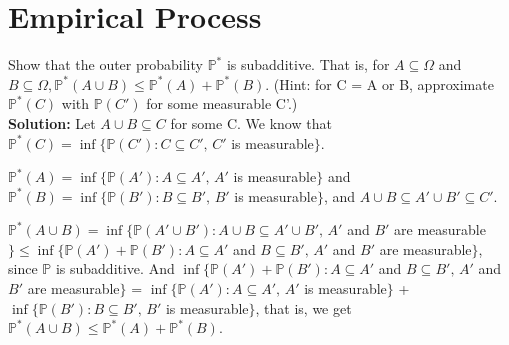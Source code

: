 \documentclass[11pt,letterpaper]{article}                  %
\begin{document}
\section{Empirical Process}

\begin{problem} Show that the outer probability $\mathbb{P}^*$ is subadditive. That is, for $A \subseteq \Omega$ and $B \subseteq \Omega, \mathbb{P}^*(A \cup B) \leq \mathbb{P}^*(A) + \mathbb{P}^*(B)$. (Hint: for C = A or B, approximate $\mathbb{P}^*(C)$ with $\mathbb{P}(C')$ for some measurable C'.) \\
	
	\textbf{Solution:}  Let $A \cup B \subseteq C$ for some C. We know that $\mathbb{P}^*(C) = \inf \{\mathbb{P}(C'): C \subseteq C', \, C'$ is measurable$\}$. 
	
	$\mathbb{P}^*(A) = \inf \{\mathbb{P}(A'): A \subseteq A', \, A'$ is measurable$\}$ and $\mathbb{P}^*(B) = \inf \{\mathbb{P}(B'): B \subseteq B', \, B'$ is measurable$\}$, and $A \cup B \subseteq A' \cup B' \subseteq C'$. 
	
	$\mathbb{P}^*(A \cup B) = \inf \{\mathbb{P}(A' \cup B'): A \cup B \subseteq A' \cup B', \, A'$ and $B'$ are measurable$\} \leq \inf \{\mathbb{P}(A') +  \mathbb{P}(B'): A \subseteq A'$ and $B \subseteq B', \, A'$ and $B'$ are measurable$\}$, since $\mathbb{P}$ is subadditive. And $\inf \{\mathbb{P}(A') +  \mathbb{P}(B'): A \subseteq A'$ and $B \subseteq B', \, A'$ and $B'$ are measurable$\}$ = $\inf \{\mathbb{P}(A'): A \subseteq A', \, A'$ is measurable$\}$ + $\inf \{\mathbb{P}(B'): B \subseteq B', \, B'$ is measurable$\}$, that is, we get $\mathbb{P}^*(A \cup B) \leq \mathbb{P}^*(A) + \mathbb{P}^*(B)$.
\end{problem}
\end{document}
